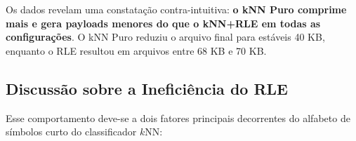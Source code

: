 \documentclass[
	12pt,
	openright,
	oneside,
	a4paper,
	english,
	brazil
	]{abntex2}
\begin{document}
\begin{table}[H]
\centering
\caption{Comparação de redução: kNN Puro vs kNN+RLE}
\label{tab:pure_vs_rle}
\end{table}

Os dados revelam uma constatação contra-intuitiva: \textbf{o kNN Puro comprime mais e gera payloads menores do que o kNN+RLE em todas as configurações}. O kNN Puro reduziu o arquivo final para estáveis 40 KB, enquanto o RLE resultou em arquivos entre 68 KB e 70 KB.

\subsection{Discussão sobre a Ineficiência do RLE}

Esse comportamento deve-se a dois fatores principais decorrentes do alfabeto de símbolos curto do classificador $k$NN:
\end{document}
